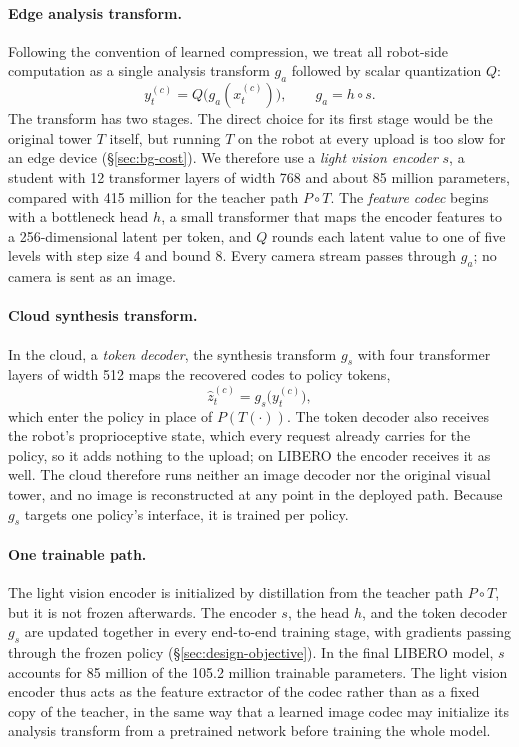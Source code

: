 \paragraph{Edge analysis transform.}
Following the convention of learned compression, we treat all
robot-side computation as a single analysis transform $g_a$ followed by
scalar quantization $Q$:
\begin{equation}
  y_t^{(c)} = Q\big(g_a(x_t^{(c)})\big), \qquad g_a = h \circ s .
  \label{eq:analysis}
\end{equation}
The transform has two stages. The direct choice for its first stage
would be the original tower $T$ itself, but running $T$ on the robot at
every upload is too slow for an edge device (\S\ref{sec:bg-cost}).
We therefore use a \emph{light vision encoder} $s$, a student with 12
transformer layers of width 768 and about 85 million parameters, compared
with 415 million for the teacher path $P \circ T$. The \emph{feature codec}
begins with a bottleneck head $h$, a small transformer that maps the
encoder features to a 256-dimensional latent per token, and $Q$
rounds each latent value to one of five levels with step size 4 and
bound 8. Every camera stream passes through $g_a$; no camera is sent as
an image.

\paragraph{Cloud synthesis transform.}
In the cloud, a \emph{token decoder}, the synthesis transform $g_s$ with four transformer layers
of width 512 maps the recovered codes to policy tokens,
\begin{equation}
  \hat{z}_t^{(c)} = g_s\big(y_t^{(c)}\big),
  \label{eq:synthesis}
\end{equation}
which enter the policy in place of $P(T(\cdot))$. The token decoder also
receives the robot's proprioceptive state, which every request already
carries for the policy, so it adds nothing to the upload; on LIBERO the
encoder receives it as well. The cloud therefore
runs neither an image decoder nor the original visual tower, and no
image is reconstructed at any point in the deployed path. Because $g_s$
targets one policy's interface, it is trained per policy.

\paragraph{One trainable path.}
The light vision encoder is initialized by distillation from the teacher
path $P \circ T$, but it is not frozen afterwards. The encoder $s$, the head $h$, and the token decoder $g_s$
are updated together in every end-to-end training stage, with gradients
passing through the frozen policy (\S\ref{sec:design-objective}). In
the final LIBERO model, $s$ accounts for 85 million of the 105.2
million trainable parameters. The light vision encoder thus acts as the
feature extractor of the codec rather than as a fixed copy of the teacher, in the
same way that a learned image codec may initialize its analysis
transform from a pretrained network before training the whole model.

